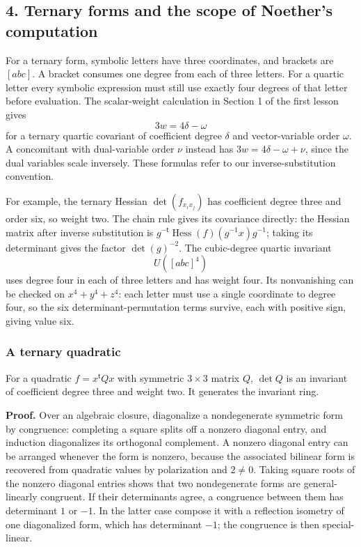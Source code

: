 \documentclass[
]{article}
\begin{document}
\subsection{4. Ternary forms and the scope of Noether's
computation}\label{section-4}

For a ternary form, symbolic letters have three coordinates, and
brackets are \([abc]\). A bracket consumes one degree from each of three
letters. For a quartic letter every symbolic expression must still use
exactly four degrees of that letter before evaluation. The scalar-weight
calculation in Section 1 of the first lesson gives \[
3w=4\delta-\omega
\] for a ternary quartic covariant of coefficient degree \(\delta\) and
vector-variable order \(\omega\). A concomitant with dual-variable order
\(\nu\) instead has \(3w=4\delta-\omega+\nu\), since the dual variables
scale inversely. These formulas refer to our inverse-substitution
convention.

For example, the ternary Hessian \(\det(f_{x_ix_j})\) has coefficient
degree three and order six, so weight two. The chain rule gives its
covariance directly: the Hessian matrix after inverse substitution is
\(g^{-\mathsf t}\operatorname{Hess}(f)(g^{-1}x)g^{-1}\); taking its
determinant gives the factor \(\det(g)^{-2}\). The cubic-degree quartic
invariant \[
U([abc]^4)
\] uses degree four in each of three letters and has weight four. Its
nonvanishing can be checked on \(x^4+y^4+z^4\): each letter must use a
single coordinate to degree four, so the six determinant-permutation
terms survive, each with positive sign, giving value six.

\subsubsection{A ternary quadratic}\label{a-ternary-quadratic}

For a quadratic \(f=x^{\mathsf t}Qx\) with symmetric \(3\times3\) matrix
\(Q\), \(\det Q\) is an invariant of coefficient degree three and weight
two. It generates the invariant ring.

\textbf{Proof.} Over an algebraic closure, diagonalize a nondegenerate
symmetric form by congruence: completing a square splits off a nonzero
diagonal entry, and induction diagonalizes its orthogonal complement. A
nonzero diagonal entry can be arranged whenever the form is nonzero,
because the associated bilinear form is recovered from quadratic values
by polarization and \(2\ne0\). Taking square roots of the nonzero
diagonal entries shows that two nondegenerate forms are general-linearly
congruent. If their determinants agree, a congruence between them has
determinant \(1\) or \(-1\). In the latter case compose it with a
reflection isometry of one diagonalized form, which has determinant
\(-1\); the congruence is then special-linear.
\end{document}
